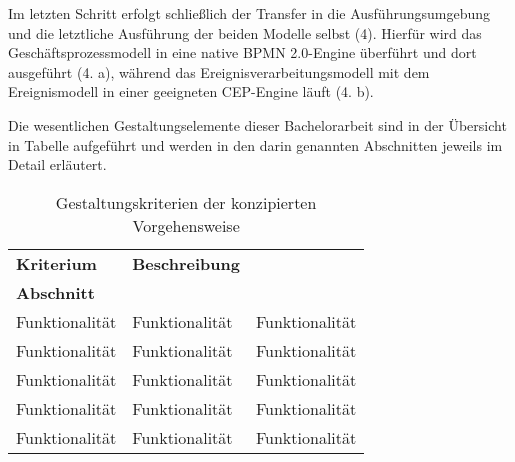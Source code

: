 Im letzten Schritt erfolgt schließlich der Transfer in die Ausführungsumgebung und die letztliche Ausführung der beiden Modelle selbst (4). Hierfür wird das Geschäftsprozessmodell in eine native BPMN 2.0-Engine überführt und dort ausgeführt (4. a), während das Ereignisverarbeitungsmodell mit dem Ereignismodell in einer geeigneten CEP-Engine läuft (4. b).





Die wesentlichen Gestaltungselemente dieser Bachelorarbeit sind in der Übersicht in Tabelle \todo{} aufgeführt und werden in den darin genannten Abschnitten jeweils im Detail erläutert.

\begin{table}[H]
	\centering
	\begin{tabularx}{\textwidth}{l X X} 
		\toprule
		\textbf{Kriterium}  &   
		\textbf{Beschreibung}  \\ 
		\textbf{Abschnitt}  \\ 
		\toprule
		Funktionalität &   
		Funktionalität &
		Funktionalität      \\  \cmidrule(r){1-1} \cmidrule(r){2-2} \cmidrule(r){3-3}
		
		Funktionalität &   
		Funktionalität &
		Funktionalität      \\  \cmidrule(r){1-1} \cmidrule(r){2-2} \cmidrule(r){3-3}
		
		Funktionalität &   
		Funktionalität &
		Funktionalität      \\  \cmidrule(r){1-1} \cmidrule(r){2-2} \cmidrule(r){3-3}
		
		Funktionalität &   
		Funktionalität &
		Funktionalität      \\  \cmidrule(r){1-1} \cmidrule(r){2-2} \cmidrule(r){3-3}
		
		Funktionalität &   
		Funktionalität &
		Funktionalität      \\  \bottomrule
	\end{tabularx}
	\caption[Gestaltungskriterien der konzipierten Vorgehensweise]
    {Gestaltungskriterien der konzipierten Vorgehensweise}
    \label{tab:Gestaltungskriterien der konzipierten Vorgehensweise}
\end{table}

